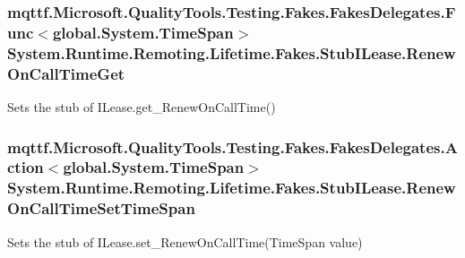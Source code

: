 \hypertarget{class_system_1_1_runtime_1_1_remoting_1_1_lifetime_1_1_fakes_1_1_stub_i_lease_abfd85f79386ce5dbb4f80b4ea618370e}{
\subsubsection[{Renew\-On\-Call\-Time\-Get}]{\setlength{\rightskip}{0pt plus 5cm}mqttf.\-Microsoft.\-Quality\-Tools.\-Testing.\-Fakes.\-Fakes\-Delegates.\-Func$<$global.\-System.\-Time\-Span$>$ System.\-Runtime.\-Remoting.\-Lifetime.\-Fakes.\-Stub\-I\-Lease.\-Renew\-On\-Call\-Time\-Get}}\label{class_system_1_1_runtime_1_1_remoting_1_1_lifetime_1_1_fakes_1_1_stub_i_lease_abfd85f79386ce5dbb4f80b4ea618370e}


Sets the stub of I\-Lease.\-get\-\_\-\-Renew\-On\-Call\-Time()

\hypertarget{class_system_1_1_runtime_1_1_remoting_1_1_lifetime_1_1_fakes_1_1_stub_i_lease_a1d0c27cf632f55bf5f58710aa3e917c2}{
\subsubsection[{Renew\-On\-Call\-Time\-Set\-Time\-Span}]{\setlength{\rightskip}{0pt plus 5cm}mqttf.\-Microsoft.\-Quality\-Tools.\-Testing.\-Fakes.\-Fakes\-Delegates.\-Action$<$global.\-System.\-Time\-Span$>$ System.\-Runtime.\-Remoting.\-Lifetime.\-Fakes.\-Stub\-I\-Lease.\-Renew\-On\-Call\-Time\-Set\-Time\-Span}}\label{class_system_1_1_runtime_1_1_remoting_1_1_lifetime_1_1_fakes_1_1_stub_i_lease_a1d0c27cf632f55bf5f58710aa3e917c2}


Sets the stub of I\-Lease.\-set\-\_\-\-Renew\-On\-Call\-Time(\-Time\-Span value)

